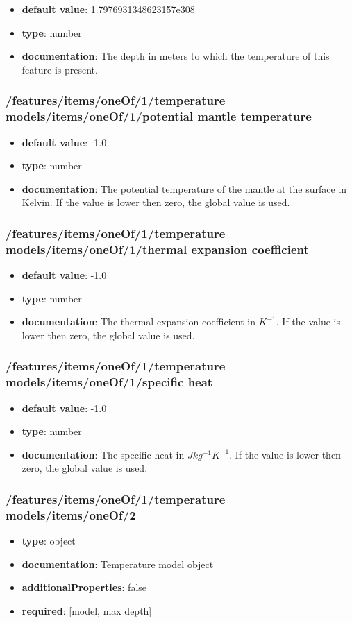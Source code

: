 \begin{itemize}\item {\bf default value}: 1.7976931348623157e308
\item {\bf type}: number
\item {\bf documentation}: The depth in meters to which the temperature of this feature is present.
\end{itemize}\subsubsection{/features/items/oneOf/1/temperature models/items/oneOf/1/potential mantle temperature}
\begin{itemize}\item {\bf default value}: -1.0
\item {\bf type}: number
\item {\bf documentation}: The potential temperature of the mantle at the surface in Kelvin. If the value is lower then zero, the global value is used.
\end{itemize}\subsubsection{/features/items/oneOf/1/temperature models/items/oneOf/1/thermal expansion coefficient}
\begin{itemize}\item {\bf default value}: -1.0
\item {\bf type}: number
\item {\bf documentation}: The thermal expansion coefficient in $K^{-1}$. If the value is lower then zero, the global value is used.
\end{itemize}\subsubsection{/features/items/oneOf/1/temperature models/items/oneOf/1/specific heat}
\begin{itemize}\item {\bf default value}: -1.0
\item {\bf type}: number
\item {\bf documentation}: The specific heat in $J kg^{-1} K^{-1}$. If the value is lower then zero, the global value is used.
\end{itemize}\subsubsection{/features/items/oneOf/1/temperature models/items/oneOf/2}
\begin{itemize}\item {\bf type}: object
\item {\bf documentation}: Temperature model object
\item {\bf additionalProperties}: false
\item {\bf required}: [model, max depth]\end{itemize}
